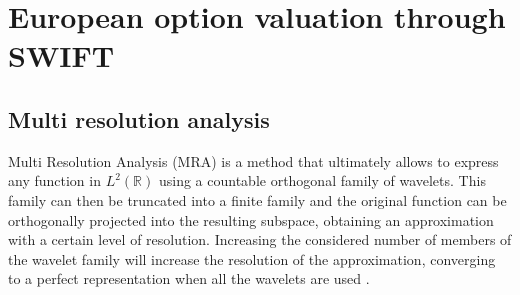 \documentclass[12,twoside]{mammeTFM}
\newtheorem{lem}[thm]{Lemma}
\theoremstyle{definition}
\theoremstyle{remark}
\newcommand{\R}{\ensuremath{\mathbb{R}}}
\begin{document}





\section{European option valuation through SWIFT}

\subsection{Multi resolution analysis} \label{def:mra}
Multi Resolution Analysis (MRA) is a method that ultimately allows to express any function in $L^2(\R)$ using a countable orthogonal family of wavelets. This family can then be truncated into a finite family and the original function can be orthogonally projected into the resulting subspace, obtaining an approximation with a certain level of resolution. Increasing the considered number of members of the wavelet family will increase the resolution of the approximation, converging to a perfect representation when all the wavelets are used \cite{tour}.
\end{document}
